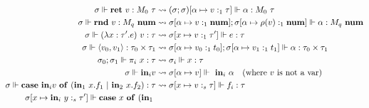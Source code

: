 \begin{figure}
\begin{center}
\begin{equation*}
\begin{aligned}[c]
    \sigma \Vdash \mathbf{ret} \ v : M_0 \ \tau &\rightsquigarrow (\sigma;
    \sigma) [\alpha \mapsto v :_1 \tau] \Vdash \alpha : M_0 \ \tau \\
    \sigma \Vdash \mathbf{rnd} \ v : M_q \ \mathbf{num} &\rightsquigarrow \sigma
    [\alpha \mapsto v :_1 \mathbf{num}]; \sigma [\alpha \mapsto \rho(v) :_1
    \mathbf{num}] \Vdash \alpha : M_q \ \mathbf{num} \\
    \sigma \Vdash (\lambda x : \tau' .e) \ v : \tau &\rightsquigarrow \sigma[x
    \mapsto v :_1 \tau'] \Vdash e : \tau \\
    \sigma \Vdash \langle v_0,v_1 \rangle : \tau_0 \times \tau_1
    &\rightsquigarrow \sigma[\alpha \mapsto v_0 :_1 t_0]; \sigma[\alpha \mapsto
    v_1 :_1 t_1] \Vdash \alpha : \tau_0 \times \tau_1\\
    \sigma_0; \sigma_1 \Vdash \pi_i \ x : \tau &\rightsquigarrow \sigma_i \Vdash x
    : \tau \\ 
    \sigma \Vdash \tin_i v &\rightsquigarrow \sigma[\alpha \mapsto v]
    \Vdash \ \tin_i \ \alpha \quad \text{(where $v$ is not a var)} \\
    \sigma \Vdash \mathbf{case} \ \tin_i v \ \mathbf{of} \ (\tin_1 \ x.f_1 \ | \
    \tin_2 \ x.f_2 ) : \tau &\rightsquigarrow \sigma[x \mapsto v :_s \tau]
    \Vdash f_i : \tau \\
    \sigma [x \mapsto \tin_i \ y :_s \tau'] \Vdash \mathbf{case} \ x \ \mathbf{of} \ (\tin_1 \

\end{aligned}
\end{equation*}
\end{center}
\end{figure}
